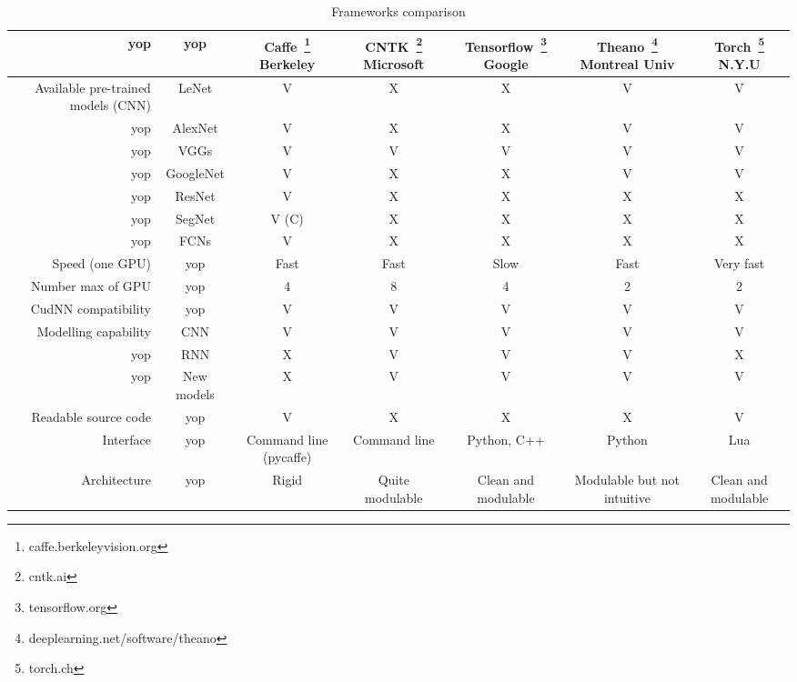 \begin{appendices}
\begin{landscape}
\begin{table}[htbp]
  \centering
  \begin{tabular}{rcccccc}
    \rowcolor{gray!50}
    \toprule
    yop & yop & \textbf{Caffe~\footnote{caffe.berkeleyvision.org} Berkeley} & \textbf{CNTK~\footnote{cntk.ai} Microsoft} & \textbf{Tensorflow~\footnote{tensorflow.org} Google} & \textbf{Theano~\footnote{deeplearning.net/software/theano} Montreal Univ} & \textbf{Torch~\footnote{torch.ch} N.Y.U} \\
    \midrule
    Available pre-trained models (CNN) & LeNet  & V & X & X & V & V \\
    yop & AlexNet  & V & X & X & V & V \\
    yop & VGGs  & V & V & V & V & V \\
    yop & GoogleNet  & V & X & X & V & V \\
    yop & ResNet  & V & X & X & X & X \\
    yop  & SegNet  & V (C) & X & X & X & X \\
    yop  & FCNs  & V & X & X & X & X \\
    Speed (one GPU) & yop  & Fast & Fast & Slow & Fast & Very fast \\
    Number max of GPU & yop  & 4 & 8 & 4 & 2 & 2 \\
    CudNN compatibility & yop  & V & V & V & V & V \\
    Modelling capability & CNN & V & V & V & V & V \\
    yop & RNN & X & V & V & V & X \\
    yop & New models & X & V & V & V & V \\
    Readable source code & yop & V & X & X & X & V \\
    Interface & yop & Command line (pycaffe) & Command line & Python, C++ & Python & Lua \\
    Architecture & yop & Rigid & Quite modulable & Clean and modulable & Modulable but not intuitive & Clean and modulable \\
    \bottomrule
  \end{tabular}%
  
  \caption{Frameworks comparison}
  \label{appendices:frameworks_comparison}
\end{table}%
\end{landscape}

\begin{table}[htbp]
  \centering
  

\end{table}
\end{appendices}

